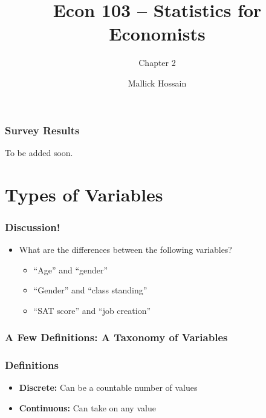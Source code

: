 \documentclass{beamer}
\title{Econ 103 -- Statistics for Economists}
\subtitle{Chapter 2}
\author{Mallick Hossain}
\date{}
\institute{University of Pennsylvania}
\begin{document}
\begin{frame}
	\titlepage 
\end{frame} 

\begin{frame}
\frametitle{Survey Results}
	To be added soon.
\end{frame} 

\section{Types of Variables}
\begin{frame}
\frametitle{Discussion!}
	\begin{itemize}
		\item What are the differences between the following variables?
		\begin{itemize}
			\item ``Age'' and ``gender''
			\item ``Gender'' and ``class standing''
			\item ``SAT score'' and ``job creation''
		\end{itemize}
	\end{itemize}
\end{frame} 

\begin{frame}
\frametitle{A Few Definitions: A Taxonomy of Variables}
	\begin{figure}[htbp]
	\begin{center}
		\end{center}
	\end{figure}
\end{frame}

\begin{frame}
\frametitle{Definitions}
	\begin{itemize}
		\item \textbf{Discrete:} Can be a countable number of values
		\item \textbf{Continuous:} Can take on any value
	\end{itemize}
\end{frame}
\end{document}
